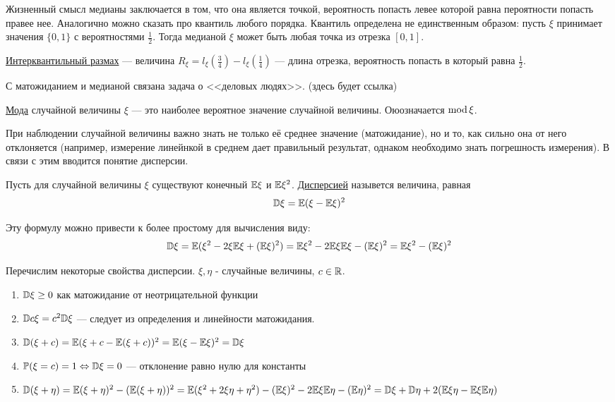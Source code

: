 Жизненный смысл медианы заключается в том, что она является точкой, вероятность попасть левее которой равна пероятности попасть правее нее. Аналогично можно 
сказать про квантиль любого порядка. Квантиль определена не единственным образом: пусть $\xi$ принимает значения $\{0, 1\}$ с вероятностями $\frac12$. Тогда медианой
$\xi$ может быть любая точка из отрезка $[0,1]$.

\begin{Def}
\underline{Интерквантильный размах} --- величина $R_\xi = l_\xi(\frac34) - l_\xi(\frac14)$ --- длина отрезка, вероятность попасть в который равна $\frac12$. 
\end{Def}

С матожиданием и медианой связана задача о <<деловых людях>>. (здесь будет ссылка) 

\begin{Def}
\underline{Мода} случайной величины $\xi$ --- это наиболее вероятное значение случайной величины. Оюозначается ${\rm mod \,}\xi$.
\end{Def}

При наблюдении случайной величины важно знать не только её среднее значение (матожидание), но и то, как сильно она от него отклоняется (например, измерение линейнкой в среднем дает правильный результат, однаком необходимо знать погрешность измерения). В связи с этим вводится понятие дисперсии.

\begin{Def}
Пусть для случайной величины $\xi$ существуют конечный $\mathbb{E}\xi$ и $\mathbb{E}\xi^2$.  \underline{Дисперсией} назывется величина, равная 
$$ \mathbb{D}\xi = \mathbb{E}(\xi - \mathbb{E}\xi)^2$$
\end{Def}

Эту формулу можно привести к более простому для вычисления виду:
$$\mathbb{D}\xi = \mathbb{E}(\xi^2 - 2\xi\mathbb{E}\xi + (\mathbb{E}\xi)^2) = \mathbb{E}\xi^2 - 2\mathbb{E}\xi\mathbb{E}\xi - (\mathbb{E}\xi)^2 = \mathbb{E}\xi^2 - (\mathbb{E}\xi)^2$$


Перечислим некоторые свойства дисперсии. $\xi,\eta$ - случайные величины, $c \in \mathbb{R}$.

\begin{enumerate}
	\item $\mathbb{D}\xi \ge 0$ как матожидание от неотрицательной функции
	\item $\mathbb{D} c\xi = c^2 \mathbb{D}\xi$ --- следует из определения и линейности матожидания.
	\item $\mathbb{D}(\xi+c) = \mathbb{E}(\xi + c - \mathbb{E}(\xi + c))^2 = \mathbb{E}(\xi - \mathbb{E}\xi)^2 = \mathbb{D}\xi$
	\item $\mathbb{P}(\xi = c) = 1 \Leftrightarrow \mathbb{D}\xi = 0$ --- отклонение равно нулю для константы
	\item $\mathbb{D}(\xi + \eta) = \mathbb{E}(\xi+\eta)^2 - (\mathbb{E}(\xi+\eta))^2 = \mathbb{E}(\xi^2+2\xi\eta + \eta^2) - (\mathbb{E}\xi)^2- 2\mathbb{E}\xi\mathbb{E}\eta - (\mathbb{E}\eta)^2 = \mathbb{D}\xi + \mathbb{D}\eta + 2(\mathbb{E}\xi\eta - \mathbb{E}\xi\mathbb{E}\eta)$
\end{enumerate}

